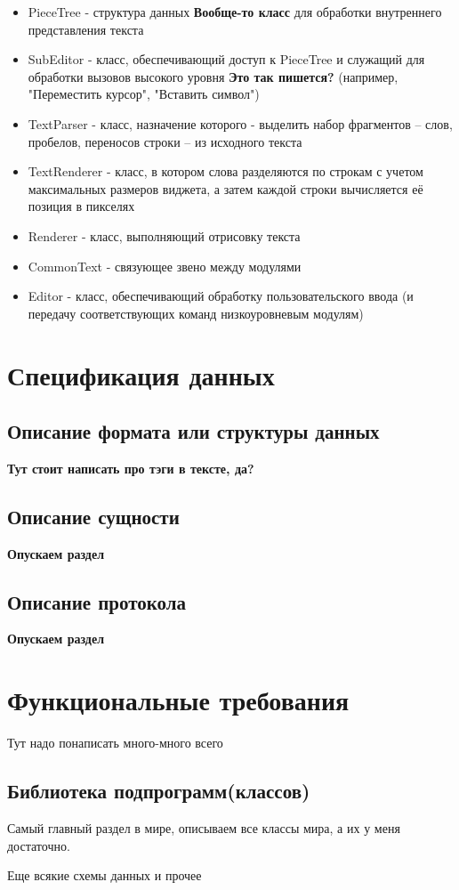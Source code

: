 \documentclass{fefu}
\begin{document}
		\begin{itemize}
			\item PieceTree - структура данных \textbf{Вообще-то класс} для обработки 
			внутреннего представления текста
			\item SubEditor - класс, обеспечивающий доступ к PieceTree и служащий для 
			обработки вызовов высокого уровня \textbf{Это так пишется?} (например, 
			"Переместить курсор", "Вставить символ")
			\item TextParser - класс, назначение которого - выделить набор фрагментов -- слов, 
			пробелов, переносов строки -- из исходного текста
			\item TextRenderer - класс, в котором слова разделяются по строкам с учетом 
			максимальных размеров виджета, а затем каждой строки вычисляется её позиция 
			в пикселях
			\item Renderer - класс, выполняющий отрисовку текста
			\item CommonText - связующее звено между модулями
			\item Editor - класс, обеспечивающий обработку пользовательского ввода (и 
			передачу соответствующих команд низкоуровневым модулям)
		\end{itemize}
	\section{Спецификация данных}
		\subsection{Описание формата или структуры данных}
			\textbf{Тут стоит написать про тэги в тексте, да?}
		\subsection{Описание сущности}
			\textbf{Опускаем раздел}
		\subsection{Описание протокола}
			\textbf{Опускаем раздел}
	\section{Функциональные требования}
		\par Тут надо понаписать много-много всего
		\subsection{Библиотека подпрограмм(классов)}
			\par Самый главный раздел в мире, описываем все классы мира, а их у меня 
			достаточно.
			\par Еще всякие схемы данных и прочее
\end{document}
